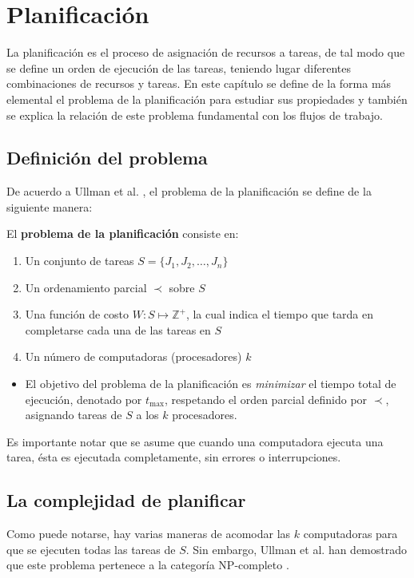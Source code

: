 \chapter{Planificación}
La planificación
es el proceso de asignación de recursos a tareas, de tal modo que se define un orden de ejecución de las tareas, teniendo lugar diferentes combinaciones de recursos y tareas. En este capítulo se define de la forma más elemental el problema de la planificación para estudiar sus propiedades y también se explica la relación de este problema fundamental con los flujos de trabajo.


\section{Definición del problema}
De acuerdo a  Ullman et al. \cite{ullman1975np}, el problema de la planificación se define de la siguiente manera: 

\begin{defn}
El \textbf{problema de la planificación} consiste en:
\begin{enumerate}
\item Un conjunto de tareas $S = \{ J_1, J_2, \dots, J_n \}$
\item Un ordenamiento parcial $\prec$ sobre $S$
\item Una función de costo $W: S \mapsto \mathbb{Z}^{+}$, la cual indica el tiempo que tarda en completarse cada una de las tareas en $S$
\item Un número de computadoras (procesadores) $k$
\end{enumerate}
\begin{itemize}
\item El objetivo del problema de la planificación es \emph{minimizar} el tiempo total de ejecución, denotado por $t_\text{max}$, respetando el orden parcial definido por $\prec$, asignando tareas de $S$ a los $k$ procesadores.
\end{itemize}
Es importante notar que se asume que cuando una computadora ejecuta una tarea, ésta es ejecutada completamente, sin errores o interrupciones.
\end{defn}


\section{La complejidad de planificar}
Como puede notarse, hay varias maneras de acomodar las $k$ computadoras para que se ejecuten todas las tareas de $S$. Sin embargo, Ullman et al. han demostrado que este problema pertenece a la categoría NP-completo \cite{ullman1975np}.


